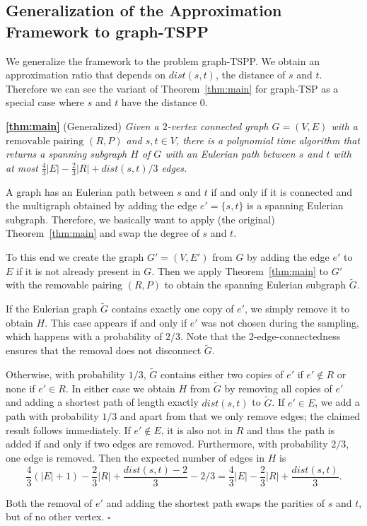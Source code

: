 \documentclass[letterpaper,11pt]{article}
\newenvironment{proof}{\begin{trivlist}
\item[\hskip\labelsep {\bf Proof}.]}{\QED \end{trivlist}}
\newenvironment{apptheorem}{\begin{trivlist}
        \item[\hskip\labelsep {\bf Theorem}]}{ \end{trivlist}}
\newcommand{\QED}{\hfill $\square$}
\newcommand{\MS}{\ensuremath{\mbox{removable pairing}}\xspace}
\newcommand{\TSP}{graph-TSP\xspace}
\newcommand{\HPP}{graph-TSPP\xspace}
\newcommand{\dist}[1]{\ensuremath{dist(#1)}}
\begin{document}
\subsection{Generalization of the Approximation Framework to \HPP}

We generalize the framework to the problem \HPP. We obtain an
approximation ratio that depends on $\dist{s,t}$, the distance of $s$
and $t$. Therefore we can see the variant of Theorem~\ref{thm:main}
for \TSP as a special case where $s$ and $t$ have the distance 0.

\begin{apptheorem}{\textbf{\ref{thm:main}}} (Generalized) \emph{
  Given a $2$-vertex connected graph $G=(V,E)$ with a \MS{} $(R,P)$ and
  $s,t\in V$, there is a polynomial time algorithm that returns
  a spanning subgraph $H$ of $G$ with an Eulerian path between $s$ and $t$ with at most
  $\frac{4}{3}|E| - \frac{2}{3} |R| + \dist{s,t}/3$ edges.}
\end{apptheorem}
\begin{proof}
  A graph has an Eulerian path between $s$ and $t$ if and only if it
  is connected and the multigraph obtained by adding the edge $e'=\{s,t\}$ is
  a spanning Eulerian subgraph. Therefore, we basically want to apply
  (the original) Theorem~\ref{thm:main} and swap the degree of $s$ and $t$.

  To this end we create the graph $G'=(V,E')$ from $G$ by adding
  the edge $e'$ to $E$ if it is not already present in
  $G$. Then we apply Theorem~\ref{thm:main} to $G'$ with the removable
  pairing $(R, P)$ to obtain the spanning Eulerian subgraph $\tilde{G}$.
  
  If the Eulerian graph $\tilde{G}$ contains exactly one copy of $e'$,
  we simply remove it to obtain $H$. This case appears if and only if $e'$ was not chosen
  during the sampling, which happens with a probability of $2/3$. Note that the 
  2-edge-connectedness ensures that the removal does not disconnect $\tilde{G}$.
  
  Otherwise, with probability $1/3$, $\tilde{G}$ contains either two copies
  of $e'$ if $e' \notin R$ or none if $e' \in  R$. In either case we obtain $H$
  from $\tilde{G}$ by removing all copies
  of $e'$ and adding a shortest
  path of length exactly $\dist{s,t}$ to $\tilde{G}$.
  If $e' \in E$, we add a path with probability $1/3$ and apart from that we
  only remove edges; the claimed result follows immediately. 
  If $e' \notin E$, it is also not in $R$ and thus the path is
  added if and only if two edges are removed. Furthermore, with probability
  $2/3$, one edge is removed. Then the expected
  number of edges in $H$ is
\[
\frac{4}{3} (|E|+1) - \frac{2}{3} |R| + \frac{\dist{s,t}-2}{3} - 2/3 =
\frac{4}{3} |E| - \frac{2}{3} |R| + \frac{\dist{s,t}}{3}.
\]
 
Both the
removal of $e'$ and adding the shortest path swaps the parities
of $s$ and $t$, but of no other vertex.
\end{proof}
\end{document}
